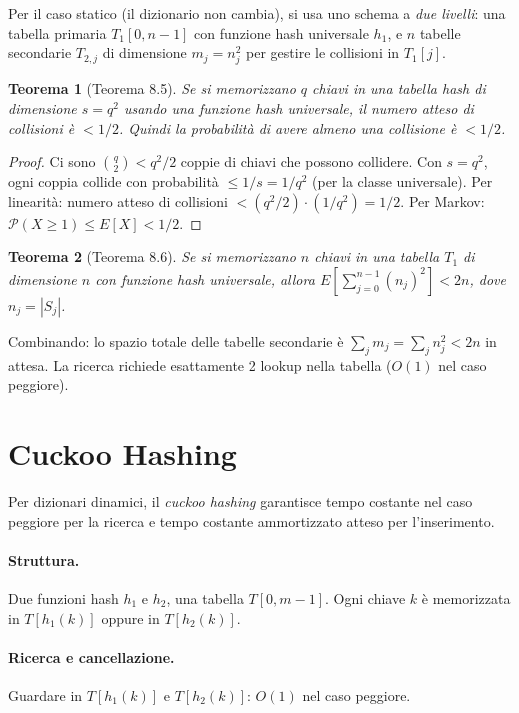 \documentclass[12pt, a4paper, oneside]{book}
\theoremstyle{plain}
\newtheorem{teorema}{Teorema}[chapter]
\theoremstyle{definition}
\theoremstyle{remark}
\begin{document}
Per il caso statico (il dizionario non cambia), si usa uno schema a \emph{due livelli}: una tabella primaria $T_1[0, n-1]$ con funzione hash universale $h_1$, e $n$ tabelle secondarie $T_{2,j}$ di dimensione $m_j = n_j^2$ per gestire le collisioni in $T_1[j]$.

\begin{teorema}[Teorema 8.5]
Se si memorizzano $q$ chiavi in una tabella hash di dimensione $s = q^2$ usando una funzione hash universale, il numero atteso di collisioni è $< 1/2$. Quindi la probabilità di avere almeno una collisione è $< 1/2$.
\end{teorema}

\begin{proof}
Ci sono $\binom{q}{2} < q^2/2$ coppie di chiavi che possono collidere. Con $s = q^2$, ogni coppia collide con probabilità $\le 1/s = 1/q^2$ (per la classe universale). Per linearità: numero atteso di collisioni $< (q^2/2) \cdot (1/q^2) = 1/2$. Per Markov: $\mathcal{P}(X \ge 1) \le E[X] < 1/2$.
\end{proof}

\begin{teorema}[Teorema 8.6]
Se si memorizzano $n$ chiavi in una tabella $T_1$ di dimensione $n$ con funzione hash universale, allora $E\!\left[\sum_{j=0}^{n-1}(n_j)^2\right] < 2n$, dove $n_j = |S_j|$.
\end{teorema}

Combinando: lo spazio totale delle tabelle secondarie è $\sum_j m_j = \sum_j n_j^2 < 2n$ in attesa. La ricerca richiede esattamente 2 lookup nella tabella ($O(1)$ nel caso peggiore).

\section{Cuckoo Hashing}

Per dizionari dinamici, il \emph{cuckoo hashing} garantisce tempo costante nel caso peggiore per la ricerca e tempo costante ammortizzato atteso per l'inserimento.

\paragraph{Struttura.} Due funzioni hash $h_1$ e $h_2$, una tabella $T[0, m-1]$. Ogni chiave $k$ è memorizzata in $T[h_1(k)]$ oppure in $T[h_2(k)]$.

\paragraph{Ricerca e cancellazione.} Guardare in $T[h_1(k)]$ e $T[h_2(k)]$: $O(1)$ nel caso peggiore.
\end{document}
